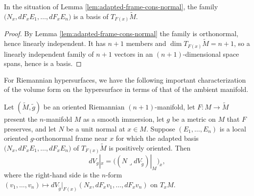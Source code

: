 \begin{lemma}
\label{lem:adapted-frame-ambient-basis}
\leanok
{}
In the situation of Lemma \ref{lem:adapted-frame-cons-normal}, the family
$\bigl(N_x, dF_x E_1, \ldots, dF_x E_n\bigr)$ is a basis of $T_{F(x)}\tilde M$.
\end{lemma}

\begin{proof}
\leanok
{}
By Lemma \ref{lem:adapted-frame-cons-normal} the family is orthonormal, hence linearly
independent. It has $n+1$ members and $\dim T_{F(x)}\tilde M = n+1$, so a linearly independent
family of $n+1$ vectors in an $(n+1)$-dimensional space spans, hence is a basis.
\end{proof}

For Riemannian hypersurfaces, we have the following important characterization of the volume form on the hypersurface in terms of that of the ambient manifold.

\begin{proposition}[Equation (2.17)]
\label{prop:hypersurface-volume-form-formula}
\leanok
{}
Let $(\tilde M, \tilde g)$ be an oriented Riemannian $(n+1)$-manifold, let $F : M \to \tilde M$
present the $n$-manifold $M$ as a smooth immersion, let $g$ be a metric on $M$ that $F$
preserves, and let $N$ be a unit normal at $x \in M$. Suppose $(E_1, \ldots, E_n)$ is a local
oriented $g$-orthonormal frame near $x$ for which the adapted basis
$\bigl(N_x, dF_x E_1, \ldots, dF_x E_n\bigr)$ of $T_{F(x)}\tilde M$ is positively oriented. Then
\begin{equation}
dV_g|_x = \bigl((N \lrcorner dV_{\tilde{g}})|_M\bigr)_x, \tag{2.17}
\end{equation}
where the right-hand side is the $n$-form $(v_1, \ldots, v_n) \mapsto
dV_{\tilde g}|_{F(x)}(N_x, dF_x v_1, \ldots, dF_x v_n)$ on $T_x M$.
\end{proposition}

